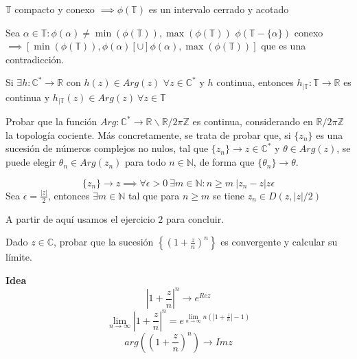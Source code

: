 \begin{sol}
$\mathbb{T}$ compacto y conexo $\implies \phi(\mathbb{T})$ es un intervalo cerrado y acotado

Sea $\alpha\in\mathbb{T} : \phi(\alpha) \not =\min(\phi(\mathbb{T})), \max(\phi(\mathbb{T}))$ 
$\phi ( \mathbb{T}-\{ \alpha \} )$ conexo $\implies [ \min(\phi(\mathbb{T})), \phi(\alpha)[ \cup ]\phi(\alpha), \max( \phi(\mathbb{T}) ) ] $ que es una contradicción.

Si $\exists h:\mathbb{C}^{\ast} \rightarrow \mathbb{R}$ con $h(z)\in Arg(z)$ $\forall z\in\mathbb{C}^{\ast}$ y $h$ continua, entonces
$h_{| \mathbb{T}} : \mathbb{T} \rightarrow \mathbb{R}$ es continua y $h_{|\mathbb{T}} (z) \in Arg(z) \ \forall z\in\mathbb{T}$
\end{sol}

\begin{ejer}
	Probar que la función $Arg : \mathbb{C}^{\ast} \rightarrow \mathbb{R}\backslash \mathbb{R}/2\pi\mathbb{Z}$ es continua, considerando en $\mathbb{R}/2\pi\mathbb{Z}$ la topología cociente. Más concretamente, se trata de probar que, si $\{z_n\}$ es una sucesión de números complejos no nulos, tal que $\{z_n\} \rightarrow z\in\mathbb{C}^{\ast}$ y $\theta\in Arg(z)$, se puede elegir $\theta_n\in Arg(z_n)$ para todo $n\in\mathbb{N}$, de forma que $\{ \theta_n \} \rightarrow \theta$.
\end{ejer}




\begin{sol}


$$
\{ z_n \} \rightarrow z \implies \forall \epsilon>0\ \exists m\in\mathbb{N} : n\geq m \ |z_n-z|z\epsilon
$$
Sea $\epsilon = \frac{|z|}{2}$, entonces 
$\exists m\in\mathbb{N}$ tal que para $n\geq m$ se tiene $z_n\in D(z, |z|/2)$

A partir de aquí usamos el ejercicio $2$ para concluir.
\end{sol}



\begin{ejer}
	Dado $z\in\mathbb{C}$, probar que la sucesión $\left\{ \left( 1+\frac{z}{n} \right)^n \right\}$ es convergente y calcular su límite.
\end{ejer}


\textbf{Idea}
$$
\left|1+\frac{z}{n}\right|^n \rightarrow e^{Re z}
$$
$$
\lim_{n\rightarrow\infty} \left|1+\frac{z}{n}\right|^n 
= e^{ \lim_{n\rightarrow\infty} n\left(\left|1+\frac{z}{n}\right|-1\right) }
$$
$$
arg\left(\left(1+\frac{z}{n}\right)^n\right) \rightarrow Im z
$$

